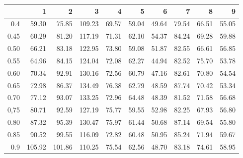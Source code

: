 \begin{table}[ht]
\centering
\begin{tabular}{rrrrrrrrrr}
  \hline
 & 1 & 2 & 3 & 4 & 5 & 6 & 7 & 8 & 9 \\ 
  \hline
0.4 & 59.30 & 75.85 & 109.23 & 69.57 & 59.04 & 49.64 & 79.54 & 66.51 & 55.05 \\ 
  0.45 & 60.29 & 81.20 & 117.19 & 71.31 & 62.10 & 54.37 & 84.24 & 69.28 & 59.88 \\ 
  0.50 & 66.21 & 83.18 & 122.95 & 73.80 & 59.08 & 51.87 & 82.55 & 66.61 & 56.85 \\ 
  0.55 & 64.96 & 84.15 & 124.04 & 72.08 & 62.27 & 44.94 & 82.52 & 75.70 & 53.78 \\ 
  0.60 & 70.34 & 92.91 & 130.16 & 72.56 & 60.79 & 47.16 & 82.61 & 70.80 & 54.54 \\ 
  0.65 & 72.98 & 86.37 & 134.49 & 76.38 & 62.79 & 48.59 & 87.74 & 70.42 & 53.34 \\ 
  0.70 & 77.12 & 93.07 & 133.25 & 72.96 & 64.48 & 48.39 & 81.52 & 71.58 & 56.68 \\ 
  0,75 & 80.71 & 92.59 & 127.19 & 75.77 & 59.55 & 52.98 & 82.25 & 67.93 & 56.80 \\ 
  0.80 & 87.32 & 95.39 & 130.47 & 75.97 & 61.44 & 50.68 & 87.14 & 69.54 & 55.80 \\ 
  0.85 & 90.52 & 99.55 & 116.09 & 72.82 & 60.48 & 50.95 & 85.24 & 71.94 & 59.67 \\ 
  0.9 & 105.92 & 101.86 & 110.25 & 75.54 & 62.56 & 48.70 & 83.18 & 74.61 & 58.95 \\ 
   \hline
\end{tabular}
\end{table}
